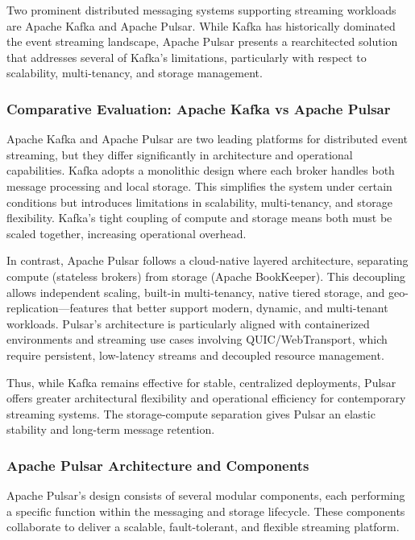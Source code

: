 Two prominent distributed messaging systems supporting streaming workloads are Apache Kafka \cite{kreps2011} and Apache Pulsar. While Kafka has historically dominated the event streaming landscape, Apache Pulsar presents a rearchitected solution that addresses several of Kafka's limitations, particularly with respect to scalability, multi-tenancy, and storage management.

\subsubsection{Comparative Evaluation: Apache Kafka vs Apache Pulsar}
Apache Kafka \cite{kreps2011} and Apache Pulsar are two leading platforms for distributed event streaming, but they differ significantly in architecture and operational capabilities. Kafka adopts a monolithic design where each broker handles both message processing and local storage. This simplifies the system under certain conditions but introduces limitations in scalability, multi-tenancy, and storage flexibility. Kafka's tight coupling of compute and storage means both must be scaled together, increasing operational overhead.

In contrast, Apache Pulsar follows a cloud-native layered architecture, separating compute (stateless brokers) from storage (Apache BookKeeper). This decoupling allows independent scaling, built-in multi-tenancy, native tiered storage, and geo-replication—features that better support modern, dynamic, and multi-tenant workloads. Pulsar's architecture is particularly aligned with containerized environments and streaming use cases involving QUIC/WebTransport, which require persistent, low-latency streams and decoupled resource management.

Thus, while Kafka remains effective for stable, centralized deployments, Pulsar offers greater architectural flexibility and operational efficiency for contemporary streaming systems. The storage-compute separation gives Pulsar an elastic stability and long-term message retention.

\subsubsection{Apache Pulsar Architecture and Components}
Apache Pulsar's design consists of several modular components, each performing a specific function within the messaging and storage lifecycle. These components collaborate to deliver a scalable, fault-tolerant, and flexible streaming platform.

